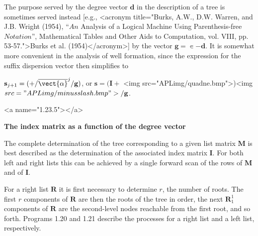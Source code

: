 {\par The purpose served by the degree vector $\mathbf{d}$ in the description of a tree is sometimes served instead [e.g., <acronym title="Burks, A.W., D.W. Warren, and J.B. Wright (1954), $“An$ Analysis of a Logical Machine Using Parenthesis-free $Notation”$, Mathematical Tables and Other Aids to Computation, vol. VIII, pp. 53-57.">Burks et al. (1954)</acronym>] by the vector $\mathbf{g} = ∊ - \mathbf{d}$. It is somewhat more convenient in the analysis of well formation, since the expression for the suffix dispersion vector then simplifies to

\par $\mathbf{s}_{j+1} = (+/\overline{\vect{\alpha}}^{ j}/\mathbf{g})$, or $\mathbf{s} = (\mathsf{\mathbf{I}} +$ <img src="APLimg/quadne.bmp">)<img $src="APLimg/minusslash.bmp">/\mathbf{g}$.

<a name="1.23.5"></a>
\par \textbf{The index matrix as a function of the degree vector}

\par The complete determination of the tree corresponding to a given list matrix $\mathbf{M}$ is best described as the determination of the associated index matrix $\mathbf{I}$. For both left and right lists this can be achieved by a single forward scan of the rows of $\mathbf{M}$ and of $\mathbf{I}$.

\par For a right list $\mathbf{R}$ it is first necessary to determine $r$, the number of roots. The first $r$ components of $\mathbf{R}$ are then the roots of the tree in order, the next $\mathbf{R}_{1}^{1}$ components of $\mathbf{R}$ are the second-level nodes reachable from the first root, and so forth. Programs 1.20 and 1.21 describe the processes for a right list and a left list, respectively.

}
